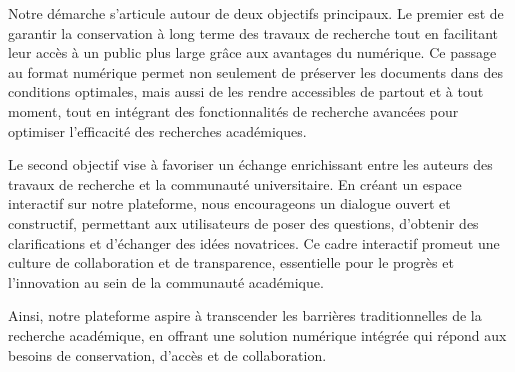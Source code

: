 Notre démarche s'articule autour de deux objectifs principaux. Le premier est de garantir la conservation à long terme des travaux de recherche tout en facilitant leur accès à un public plus large grâce aux avantages du numérique. Ce passage au format numérique permet non seulement de préserver les documents dans des conditions optimales, mais aussi de les rendre accessibles de partout et à tout moment, tout en intégrant des fonctionnalités de recherche avancées pour optimiser l'efficacité des recherches académiques.\par

Le second objectif vise à favoriser un échange enrichissant entre les auteurs des travaux de recherche et la communauté universitaire. En créant un espace interactif sur notre plateforme, nous encourageons un dialogue ouvert et constructif, permettant aux utilisateurs de poser des questions, d'obtenir des clarifications et d'échanger des idées novatrices. Ce cadre interactif promeut une culture de collaboration et de transparence, essentielle pour le progrès et l'innovation au sein de la communauté académique.\par

Ainsi, notre plateforme aspire à transcender les barrières traditionnelles de la recherche académique, en offrant une solution numérique intégrée qui répond aux besoins de conservation, d'accès et de collaboration.\par